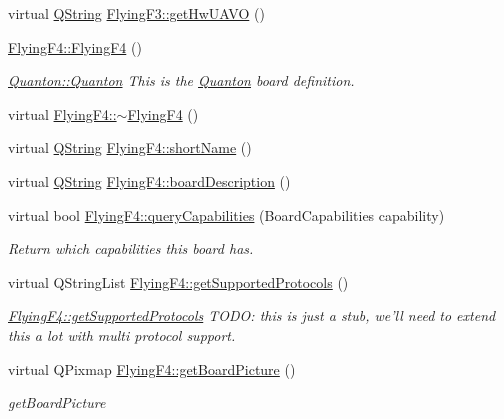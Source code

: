 \begin{DoxyCompactItemize}
virtual \hyperlink{group___u_a_v_objects_plugin_gab9d252f49c333c94a72f97ce3105a32d}{Q\-String} \hyperlink{group___boards___stm_gaa65745b439471a9a0c381fef5f5991c3}{Flying\-F3\-::get\-Hw\-U\-A\-V\-O} ()
\item 
\hyperlink{group___boards___stm_ga520fa9de4d28a0754a9ea798a89e3b56}{Flying\-F4\-::\-Flying\-F4} ()
\begin{DoxyCompactList}\small\item\em \hyperlink{group___boards___quantec_ga39ce601b1744d463fc4a56681c46135f}{Quanton\-::\-Quanton} This is the \hyperlink{class_quanton}{Quanton} board definition. \end{DoxyCompactList}\item 
virtual \hyperlink{group___boards___stm_ga901ea50bfeb75a8d451c5fa8f303f8b5}{Flying\-F4\-::$\sim$\-Flying\-F4} ()
\item 
virtual \hyperlink{group___u_a_v_objects_plugin_gab9d252f49c333c94a72f97ce3105a32d}{Q\-String} \hyperlink{group___boards___stm_ga779f6089f1d7444e4a5aad46aa1eec56}{Flying\-F4\-::short\-Name} ()
\item 
virtual \hyperlink{group___u_a_v_objects_plugin_gab9d252f49c333c94a72f97ce3105a32d}{Q\-String} \hyperlink{group___boards___stm_gaf26e4b2a68ac23e2d7aaa38e1efedc61}{Flying\-F4\-::board\-Description} ()
\item 
virtual bool \hyperlink{group___boards___stm_gae8c3f46dea83e638e7b1e9c00658cae6}{Flying\-F4\-::query\-Capabilities} (Board\-Capabilities capability)
\begin{DoxyCompactList}\small\item\em Return which capabilities this board has. \end{DoxyCompactList}\item 
virtual Q\-String\-List \hyperlink{group___boards___stm_ga414c6ad3220b62ad6230c97f000bfbac}{Flying\-F4\-::get\-Supported\-Protocols} ()
\begin{DoxyCompactList}\small\item\em \hyperlink{group___boards___stm_ga414c6ad3220b62ad6230c97f000bfbac}{Flying\-F4\-::get\-Supported\-Protocols} T\-O\-D\-O\-: this is just a stub, we'll need to extend this a lot with multi protocol support. \end{DoxyCompactList}\item 
virtual Q\-Pixmap \hyperlink{group___boards___stm_ga8d3b2a7f81995719e2f8822e5cb8d97f}{Flying\-F4\-::get\-Board\-Picture} ()
\begin{DoxyCompactList}\small\item\em get\-Board\-Picture \end{DoxyCompactList}\item 

\end{DoxyCompactItemize}
